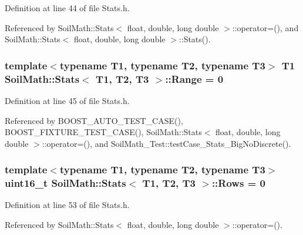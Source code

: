 Definition at line 44 of file Stats.\+h.



Referenced by Soil\+Math\+::\+Stats$<$ float, double, long double $>$\+::operator=(), and Soil\+Math\+::\+Stats$<$ float, double, long double $>$\+::\+Stats().

\hypertarget{class_soil_math_1_1_stats_a7154ac6c97dc2e83bdff7fef3cbdac5b}{}
\subsubsection[{Range}]{\setlength{\rightskip}{0pt plus 5cm}template$<$typename T1, typename T2, typename T3$>$ T1 {\bf Soil\+Math\+::\+Stats}$<$ T1, T2, T3 $>$\+::Range = 0}\label{class_soil_math_1_1_stats_a7154ac6c97dc2e83bdff7fef3cbdac5b}


Definition at line 45 of file Stats.\+h.



Referenced by B\+O\+O\+S\+T\+\_\+\+A\+U\+T\+O\+\_\+\+T\+E\+S\+T\+\_\+\+C\+A\+S\+E(), B\+O\+O\+S\+T\+\_\+\+F\+I\+X\+T\+U\+R\+E\+\_\+\+T\+E\+S\+T\+\_\+\+C\+A\+S\+E(), Soil\+Math\+::\+Stats$<$ float, double, long double $>$\+::operator=(), and Soil\+Math\+\_\+\+Test\+::test\+Case\+\_\+\+Stats\+\_\+\+Big\+No\+Discrete().

\hypertarget{class_soil_math_1_1_stats_a0e462c013f12f02e31e9ae03334151c3}{}
\subsubsection[{Rows}]{\setlength{\rightskip}{0pt plus 5cm}template$<$typename T1, typename T2, typename T3$>$ uint16\+\_\+t {\bf Soil\+Math\+::\+Stats}$<$ T1, T2, T3 $>$\+::Rows = 0}\label{class_soil_math_1_1_stats_a0e462c013f12f02e31e9ae03334151c3}


Definition at line 53 of file Stats.\+h.



Referenced by Soil\+Math\+::\+Stats$<$ float, double, long double $>$\+::operator=().

\hypertarget{class_soil_math_1_1_stats_a06f5e8404c2a0fa303dbb18a58d6deb5}{}
